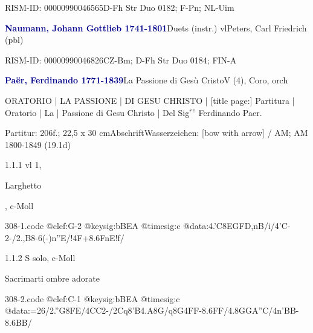 \documentclass[twocolumn, 12pt]{book}
\begin{document}
\par RISM-ID: 00000990046565\newline D-Fh  Str Duo 0182; F-Pn; NL-Uim
\par \vspace{16pt} \textcolor{darkblue}{\textbf{Naumann, Johann Gottlieb  1741-1801}}\hfillplus{\textbf{[307]}}\newline Duets (instr.) vl\newline Peters, Carl Friedrich  (pbl)
\par RISM-ID: 00000990046826\newline CZ-Bm; D-Fh  Str Duo 0184; FIN-A
\par \vspace{16pt} \textcolor{darkblue}{\textbf{Paër, Ferdinando  1771-1839}}\hfillplus{\textbf{[308]}}\newline La Passione di Gesù Cristo\newline V (4), Coro, orch
\par \begin{itshape} ORATORIO | LA PASSIONE | DI GESU CHRISTO | [title page:] Partitura | Oratorio | La | Passione di Gesu Christo | Del Sig$^r$$^e$ Ferdinando Paer.\end{itshape} 
\par \textcolor{darkblue}{}  Partitur: 206f.; 22,5 x 30 cm\newline Abschrift\newline Wasserzeichen: [bow with arrow] / AM; AM  1800-1849 (19.1d)
\par 1.1.1  vl 1, \begin{itshape}Larghetto\end{itshape}, c-Moll  
\begin{filecontents*}{308-1.code}
@clef:G-2
@keysig:bBEA
@timesig:c
@data:4.'C8E{GFD,nB}/i/4'C-2-/2.,B8-6(-)n''E/!4F+{8.6FnE}!f/
\end{filecontents*}
\newline %
\par 1.1.2  S solo, c-Moll\newline \begin{footnotesize} Sacrimarti ombre adorate \end{footnotesize}  
\begin{filecontents*}{308-2.code}
@clef:C-1
@keysig:bBEA
@timesig:c
@data:=26/2.''G{8FE}/4CC2-/2Cq8'B4.A8G/q8G4FF-8.6FF/4.8GGA''C/4n'BB-8.6BB/
\end{filecontents*}
\end{document}
